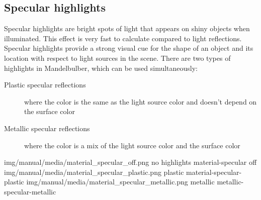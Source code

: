 \subsection{Specular highlights}\label{materials-specular}

Specular highlights are bright spots of light that appears on shiny objects when illuminated. This effect is very fast to calculate compared to light reflections. Specular highlights provide a strong visual cue for the shape of an object and its location with respect to light sources in the scene.
There are two types of highlights in Mandelbulber, which can be used simultaneously:
\begin{description}
	\item[Plastic specular reflections] where the color is the same as the light source color and doesn't depend on the surface color
	\item[Metallic specular reflections] where the color is a mix of the light source color and the surface color
\end{description}

\threeImagesWithTwoCaptionsFullWidth
{img/manual/media/material_specular_off.png}
{no highlights}
{material-specular off}
{img/manual/media/material_specular_plastic.png}
{plastic}
{material-specular-plastic}
{img/manual/media/material_specular_metallic.png}
{metallic}
{metallic-specular-metallic}

